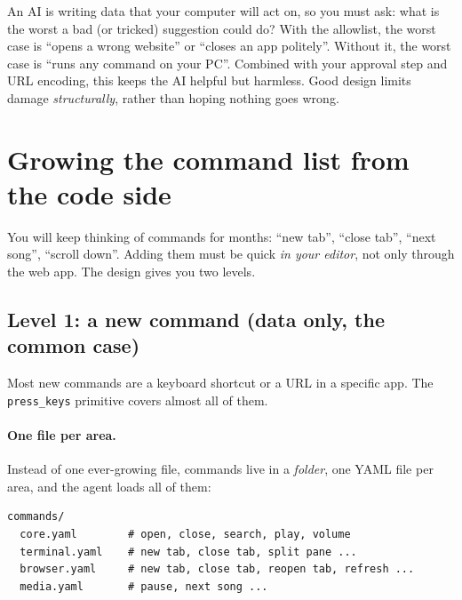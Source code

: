\documentclass[11pt,a4paper]{article}
\begin{document}
\begin{why}
An AI is writing data that your computer will act on, so you must ask: what is the worst a
bad (or tricked) suggestion could do? With the allowlist, the worst case is ``opens a wrong
website'' or ``closes an app politely''. Without it, the worst case is ``runs any command on
your PC''. Combined with your approval step and URL encoding, this keeps the AI helpful but
harmless. Good design limits damage \emph{structurally}, rather than hoping nothing goes wrong.
\end{why}

\section{Growing the command list from the code side}\label{sec:extend}

You will keep thinking of commands for months: ``new tab'', ``close tab'', ``next song'',
``scroll down''. Adding them must be quick \emph{in your editor}, not only through the web app.
The design gives you two levels.

\subsection{Level 1: a new command (data only, the common case)}

Most new commands are a keyboard shortcut or a URL in a specific app. The
\texttt{press\_keys} primitive covers almost all of them.

\paragraph{One file per area.} Instead of one ever-growing file, commands live in a
\emph{folder}, one YAML file per area, and the agent loads all of them:
\begin{lstlisting}
commands/
  core.yaml        # open, close, search, play, volume
  terminal.yaml    # new tab, close tab, split pane ...
  browser.yaml     # new tab, close tab, reopen tab, refresh ...
  media.yaml       # pause, next song ...
\end{lstlisting}
\end{document}
